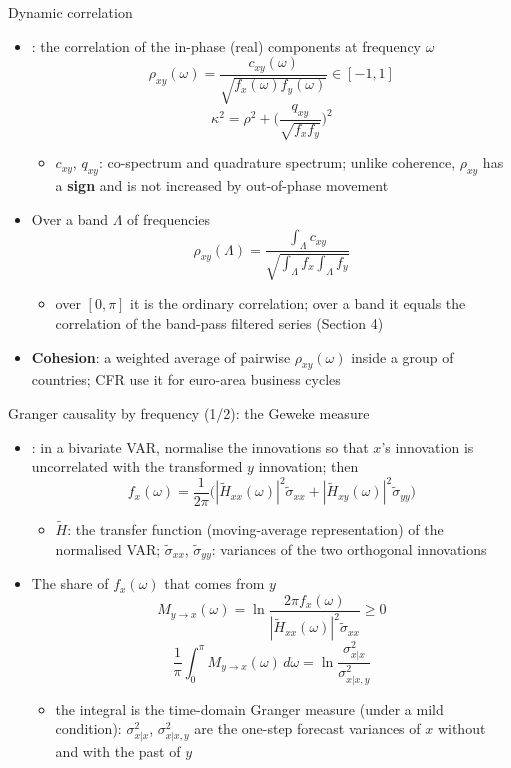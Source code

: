 \begin{frame}{Dynamic correlation}
\itemsize{\small}
\begin{itemize}
    \item {}: the correlation of the in-phase (real) components at frequency $\omega$
    \[ \rho_{xy}(\omega) = \frac{c_{xy}(\omega)}{\sqrt{f_x(\omega)f_y(\omega)}} \in [-1, 1] \]
    \[ \kappa^2 = \rho^2 + \Big(\frac{q_{xy}}{\sqrt{f_xf_y}}\Big)^2 \]
    \begin{itemize}
        \item $c_{xy}$, $q_{xy}$: co-spectrum and quadrature spectrum; unlike coherence, $\rho_{xy}$ has a \textbf{sign} and is not increased by out-of-phase movement
    \end{itemize}
    \item Over a band $\Lambda$ of frequencies
    \[ \rho_{xy}(\Lambda) = \frac{\int_\Lambda c_{xy}}{\sqrt{\int_\Lambda f_x\int_\Lambda f_y}} \]
    \begin{itemize}
        \item over $[0, \pi]$ it is the ordinary correlation; over a band it equals the correlation of the band-pass filtered series (Section 4)
    \end{itemize}
    \item \textbf{Cohesion}: a weighted average of pairwise $\rho_{xy}(\omega)$ inside a group of countries; CFR use it for euro-area business cycles
\end{itemize}
\end{frame}

\begin{frame}{Granger causality by frequency (1/2): the Geweke measure}
\itemsize{\footnotesize}
\begin{itemize}
    \item {}: in a bivariate VAR, normalise the innovations so that $x$'s innovation is uncorrelated with the transformed $y$ innovation; then
    \[ f_x(\omega) = \frac{1}{2\pi}\Big(|\tilde H_{xx}(\omega)|^2\tilde\sigma_{xx} + |\tilde H_{xy}(\omega)|^2\tilde\sigma_{yy}\Big) \]
    \begin{itemize}
        \item $\tilde H$: the transfer function (moving-average representation) of the normalised VAR; $\tilde\sigma_{xx}$, $\tilde\sigma_{yy}$: variances of the two orthogonal innovations
    \end{itemize}
    \item The share of $f_x(\omega)$ that comes from $y$
    \[ M_{y \to x}(\omega) = \ln\frac{2\pi f_x(\omega)}{|\tilde H_{xx}(\omega)|^2\tilde\sigma_{xx}} \ge 0 \]
    \[ \frac{1}{\pi}\int_0^\pi M_{y \to x}(\omega)\,d\omega = \ln\frac{\sigma^2_{x|x}}{\sigma^2_{x|x,y}} \]
    \begin{itemize}
        \item the integral is the time-domain Granger measure (under a mild condition): $\sigma^2_{x|x}$, $\sigma^2_{x|x,y}$ are the one-step forecast variances of $x$ without and with the past of $y$
    \end{itemize}
\end{itemize}
\end{frame}

